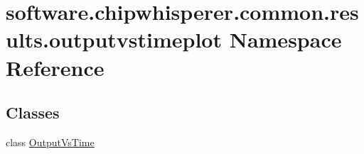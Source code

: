 \hypertarget{namespacesoftware_1_1chipwhisperer_1_1common_1_1results_1_1outputvstimeplot}{}\section{software.\+chipwhisperer.\+common.\+results.\+outputvstimeplot Namespace Reference}
\label{namespacesoftware_1_1chipwhisperer_1_1common_1_1results_1_1outputvstimeplot}
\subsection*{Classes}
\begin{DoxyCompactItemize}
\item 
class \hyperlink{classsoftware_1_1chipwhisperer_1_1common_1_1results_1_1outputvstimeplot_1_1OutputVsTime}{Output\+Vs\+Time}
\end{DoxyCompactItemize}

